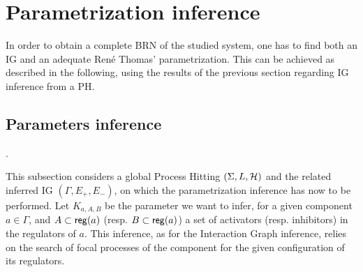 \section{Parametrization inference}\label{sec:infer-K}


In order to obtain a complete BRN of the studied system, one has to find both an IG and an adequate René Thomas' parametrization. This can be achieved as described in the following, using the results of the previous section regarding IG inference from a PH.


\subsection{Parameters inference}
.

This subsection considers a global Process Hitting $(\Sigma,L,\mathcal{H})$ and the related inferred IG $(\Gamma, E_+, E_-)$, on which the parametrization inference has now to be performed.
Let $K_{a,A,B}$ be the parameter we want to infer, for a given component $a \in \Gamma$, and $A \subset \mathsf{reg}({a})$ (resp. $B \subset \mathsf{reg}({a})$)  a set of activators (resp. inhibitors) in the regulators of $a$.
This inference, as for the Interaction Graph inference, relies on the search of focal processes of the component for the given configuration of its regulators.

